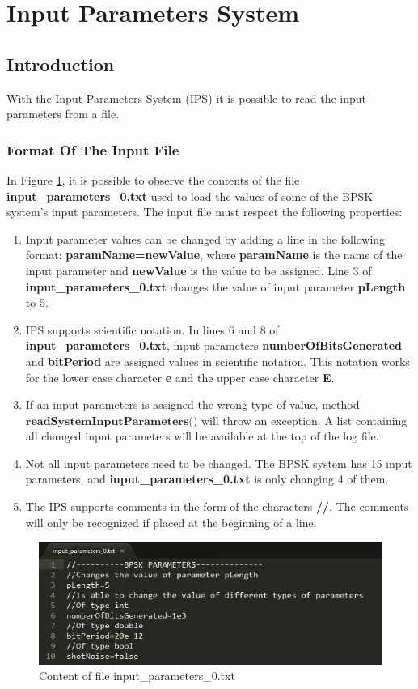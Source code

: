 \section{Input Parameters System}
\subsection{Introduction}
With the Input Parameters System (IPS) it is possible to read the input parameters from a file.

\subsubsection{Format Of The Input File}
In Figure \ref{fig:ipsfilecontent}, it is possible to observe the contents of the file \textbf{input\_parameters\_0.txt} used to load the values of some of the BPSK system's input parameters. The input file must respect the following properties:
\begin{enumerate}
\item Input parameter values can be changed by adding a line in the following format: \textbf{paramName=newValue}, where \textbf{paramName} is the name of the input parameter and \textbf{newValue} is the value to be assigned. Line 3 of \textbf{input\_parameters\_0.txt} changes the value of input parameter \textbf{pLength} to 5.
\item IPS supports scientific notation. In lines 6 and 8 of \textbf{input\_parameters\_0.txt}, input parameters \textbf{numberOfBitsGenerated} and \textbf{bitPeriod} are assigned values in scientific notation. This notation works for the lower case character \textbf{e} and the upper case character \textbf{E}.
\item If an input parameters is assigned the wrong type of value, method $\textbf{readSystemInputParameters()}$ will throw an exception.
    A list containing all changed input parameters will be available at the top of the log file.
\item Not all input parameters need to be changed. The BPSK system has 15 input parameters, and \textbf{input\_parameters\_0.txt} is only changing 4 of them.
\item The IPS supports comments in the form of the characters \textbf{//}. The comments will only be recognized if placed at the beginning of a line.
\end{enumerate}

\begin{figure}[H]
\centering
\includegraphics[width=0.8\linewidth]{./chapter/simulator_structure/figures/ips_input_file}
\caption{Content of file input\_parameters\_0.txt}
\label{fig:ipsfilecontent}
\end{figure}

